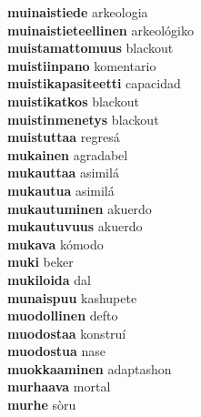 \textbf{muinaistiede } arkeologia \\
\textbf{muinaistieteellinen } arkeológiko \\
\textbf{muistamattomuus } blackout \\
\textbf{muistiinpano } komentario \\
\textbf{muistikapasiteetti } capacidad \\
\textbf{muistikatkos } blackout \\
\textbf{muistinmenetys } blackout \\
\textbf{muistuttaa } regresá \\
\textbf{mukainen } agradabel \\
\textbf{mukauttaa } asimilá \\
\textbf{mukautua } asimilá \\
\textbf{mukautuminen } akuerdo \\
\textbf{mukautuvuus } akuerdo \\
\textbf{mukava } kómodo \\
\textbf{muki } beker \\
\textbf{mukiloida } dal \\
\textbf{munaispuu } kashupete \\
\textbf{muodollinen } defto \\
\textbf{muodostaa } konstruí \\
\textbf{muodostua } nase \\
\textbf{muokkaaminen } adaptashon \\
\textbf{murhaava } mortal \\
\textbf{murhe } sòru \\
